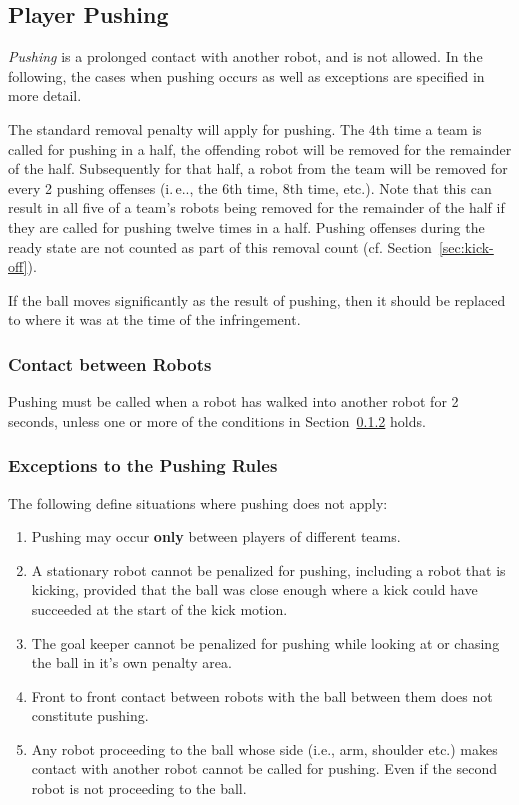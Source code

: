 \documentclass[12pt]{article}
\newcommand{\ie}{\mbox{i.\,e.}\xspace}
\newcommand{\cf}{\mbox{cf.}\xspace}
\begin{document}
\newpage

\subsection{Player Pushing}
\label{sec:player_pushing}

\emph{Pushing} is a prolonged contact with another robot, and is not allowed. In the following, the cases when pushing occurs as well as exceptions are specified in more detail.

The standard removal penalty will apply for pushing. The 4th time a team is called for pushing in a
half, the offending robot will be removed for the remainder of the half. Subsequently for that half,
a robot from the team will be removed for every 2 pushing offenses (\ie., the 6th time, 8th time, etc.).  Note that this can result in all five of a team's robots being removed for the remainder of the half if they are called for pushing twelve times in a half.  Pushing offenses during the ready state are not counted as part of this removal count (\cf Section~\ref{sec:kick-off}).

If the ball moves significantly as the result of pushing, then it should be replaced to where it was at the time of the infringement.

\subsubsection{Contact between Robots}
\label{sec:pushing_contact}
Pushing must be called when a robot has walked into another robot for 2 seconds, unless one or more of the conditions in Section~\ref{sec:situations_no_pushing} holds.

\subsubsection{Exceptions to the Pushing Rules}
\label{sec:situations_no_pushing}

The following define situations where pushing does not apply:

\begin{enumerate}
	\item Pushing may occur \textbf{only} between players of different teams.
	\item A stationary robot cannot be penalized for pushing, including a robot that is kicking, provided that the ball was close enough where a kick could have succeeded at the start of the kick motion.
	\item The goal keeper cannot be penalized for pushing while looking at or chasing the ball in it's own penalty area.
	\item Front to front contact between robots with the ball between them does not constitute pushing.
	\item Any robot proceeding to the ball whose side (i.e., arm, shoulder etc.) makes contact with another robot cannot be called for pushing. Even if the second robot is not proceeding to the ball.
\end{enumerate}
\end{document}
